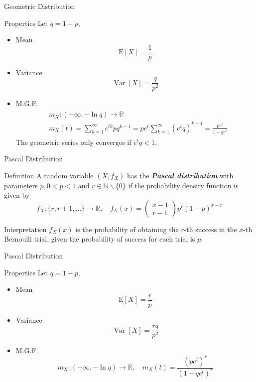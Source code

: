 \documentclass{beamer}
\newcommand{\bb}[1]{\textcolor{antiquefuchsia}{\textbf{\textit{#1}}}}
\begin{document}
\begin{frame}{Geometric Distribution}
\begin{block}{Properties}
Let $q=1-p$,
\begin{itemize}
\item Mean
$$
\mathrm{E}[X]=\frac{1}{p}
$$
\item Variance
$$
\operatorname{Var}[X]=\frac{q}{p^{2}}
$$
\item M.G.F.
\begin{align*}
\begin{aligned}
&m_{X}:(-\infty,-\ln q)\rightarrow \mathbb{R}\\
&m_X(t)=\sum_{k=1}^{\infty} e^{t k} pq^{k-1}
=p e^{t} \sum_{k=1}^{\infty} (e^{t}q)^{k-1}=\frac{p e^{t} }{1-qe^{t}}
\end{aligned}
\end{align*}
The geometric series only converges if $e^{t}q<1$.
\end{itemize}
\end{block}
\end{frame}


\begin{frame}{Pascal Distribution}
\begin{block}{Definition}
A random variable $\left(X, f_{X}\right)$ has the \bb{Pascal distribution} with parameters $p, 0<p<1$ and $r \in \mathbb{N} \backslash\{0\}$ if the probability density function is given by
$$
f_{X}:\{r, r+1, \ldots\} \rightarrow \mathbb{R}, \quad f_{X}(x)=\left(\begin{array}{c}
x-1 \\
r-1
\end{array}\right) p^{r}(1-p)^{x-r}
$$
\end{block}
\begin{block}{Interpretation}
$f_{X}(x)$ is the probability of obtaining the $r$-th success in the $x$-th Bernoulli trial, given the probability of success for each trial is $p$.
\end{block}
\end{frame}

\begin{frame}{Pascal Distribution}
\begin{block}{Properties}
Let $q=1-p$,
\begin{itemize}
\item Mean
$$
\mathrm{E}[X]=\frac{r}{p}
$$
\item Variance
$$
\operatorname{Var}[X]=\frac{rq}{p^{2}}
$$
\item M.G.F.
$$
m_{X}:(-\infty,-\ln q) \rightarrow \mathbb{R}, \quad m_{X}(t)=\frac{\left(p e^{t}\right)^{r}}{\left(1-qe^{t}\right)^{r}}
$$
\end{itemize}
\end{block}
\end{frame}
\end{document}
